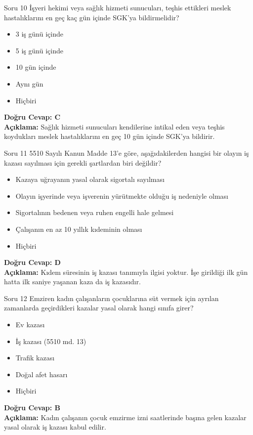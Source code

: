 \documentclass[12pt,a4paper]{article}
\begin{document}
\begin{testcard}{Soru 10}
    İşyeri hekimi veya sağlık hizmeti sunucuları, teşhis ettikleri meslek hastalıklarını en geç kaç gün içinde SGK'ya bildirmelidir?
    \begin{itemize}
        \item[A)] 3 iş günü içinde
        \item[B)] 5 iş günü içinde
        \item[C)] 10 gün içinde
        \item[D)] Aynı gün
        \item[E)] Hiçbiri
    \end{itemize}
    \tcblower
    \textbf{Doğru Cevap: C} \\
    \textbf{Açıklama:} Sağlık hizmeti sunucuları kendilerine intikal eden veya teşhis koydukları meslek hastalıklarını en geç 10 gün içinde SGK'ya bildirir.
\end{testcard}

\begin{testcard}{Soru 11}
    5510 Sayılı Kanun Madde 13'e göre, aşağıdakilerden hangisi bir olayın iş kazası sayılması için gerekli şartlardan biri değildir?
    \begin{itemize}
        \item[A)] Kazaya uğrayanın yasal olarak sigortalı sayılması
        \item[B)] Olayın işyerinde veya işverenin yürütmekte olduğu iş nedeniyle olması
        \item[C)] Sigortalının bedenen veya ruhen engelli hale gelmesi
        \item[D)] Çalışanın en az 10 yıllık kıdeminin olması
        \item[E)] Hiçbiri
    \end{itemize}
    \tcblower
    \textbf{Doğru Cevap: D} \\
    \textbf{Açıklama:} Kıdem süresinin iş kazası tanımıyla ilgisi yoktur. İşe girildiği ilk gün hatta ilk saniye yaşanan kaza da iş kazasıdır.
\end{testcard}

\begin{testcard}{Soru 12}
    Emziren kadın çalışanların çocuklarına süt vermek için ayrılan zamanlarda geçirdikleri kazalar yasal olarak hangi sınıfa girer?
    \begin{itemize}
        \item[A)] Ev kazası
        \item[B)] İş kazası (5510 md. 13)
        \item[C)] Trafik kazası
        \item[D)] Doğal afet hasarı
        \item[E)] Hiçbiri
    \end{itemize}
    \tcblower
    \textbf{Doğru Cevap: B} \\
    \textbf{Açıklama:} Kadın çalışanın çocuk emzirme izni saatlerinde başına gelen kazalar yasal olarak iş kazası kabul edilir.
\end{testcard}
\end{document}
